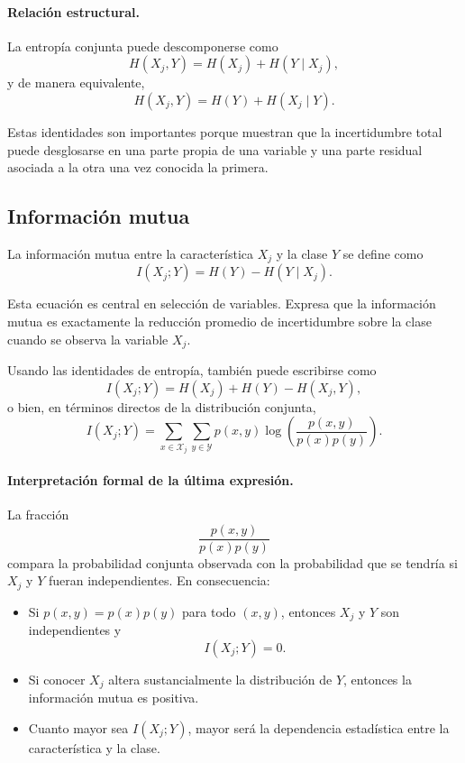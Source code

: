 \documentclass{article}
\begin{document}
\paragraph{Relación estructural.}
La entropía conjunta puede descomponerse como
\[
H(X_j,Y)=H(X_j)+H(Y\mid X_j),
\]
y de manera equivalente,
\[
H(X_j,Y)=H(Y)+H(X_j\mid Y).
\]

Estas identidades son importantes porque muestran que la incertidumbre total puede desglosarse en una parte propia de una variable y una parte residual asociada a la otra una vez conocida la primera.

\subsection{Información mutua}

La información mutua entre la característica \(X_j\) y la clase \(Y\) se define como
\[
I(X_j;Y)=H(Y)-H(Y\mid X_j).
\]

Esta ecuación es central en selección de variables. Expresa que la información mutua es exactamente la reducción promedio de incertidumbre sobre la clase cuando se observa la variable \(X_j\).

Usando las identidades de entropía, también puede escribirse como
\[
I(X_j;Y)=H(X_j)+H(Y)-H(X_j,Y),
\]
o bien, en términos directos de la distribución conjunta,
\[
I(X_j;Y)=\sum_{x\in\mathcal{X}_j}\sum_{y\in\mathcal{Y}} p(x,y)\log\left(\frac{p(x,y)}{p(x)p(y)}\right).
\]

\paragraph{Interpretación formal de la última expresión.}
La fracción
\[
\frac{p(x,y)}{p(x)p(y)}
\]
compara la probabilidad conjunta observada con la probabilidad que se tendría si \(X_j\) y \(Y\) fueran independientes. En consecuencia:

\begin{itemize}
\item Si \(p(x,y)=p(x)p(y)\) para todo \((x,y)\), entonces \(X_j\) y \(Y\) son independientes y
\[
I(X_j;Y)=0.
\]
\item Si conocer \(X_j\) altera sustancialmente la distribución de \(Y\), entonces la información mutua es positiva.
\item Cuanto mayor sea \(I(X_j;Y)\), mayor será la dependencia estadística entre la característica y la clase.
\end{itemize}
\end{document}
